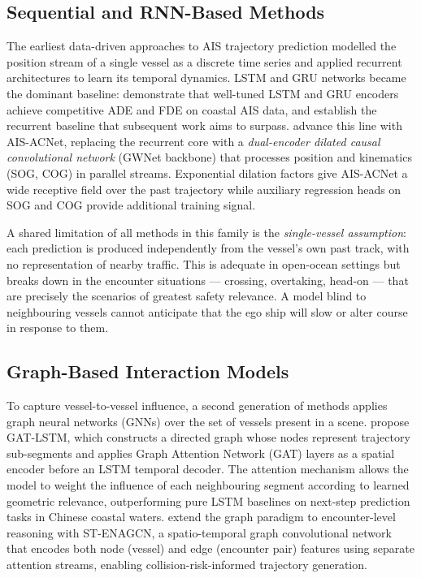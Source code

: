 \documentclass[12pt, a4paper]{article}
\begin{document}
  \subsection{Sequential and RNN-Based Methods}

  The earliest data-driven approaches to AIS trajectory prediction modelled
  the position stream of a single vessel as a discrete time series and applied
  recurrent architectures to learn its temporal dynamics.  LSTM and GRU networks
  became the dominant baseline: \citet{zhang2024lstmgru} demonstrate that
  well-tuned LSTM and GRU encoders achieve competitive ADE and FDE on coastal AIS
  data, and establish the recurrent baseline that subsequent work aims to surpass.
  \citet{shin2024aisacnet} advance this line with AIS-ACNet, replacing the recurrent
  core with a \emph{dual-encoder dilated causal convolutional network} (GWNet backbone)
  that processes position and kinematics (SOG, COG) in parallel streams.  Exponential
  dilation factors give AIS-ACNet a wide receptive field over the past trajectory
  while auxiliary regression heads on SOG and COG provide additional training signal.

  A shared limitation of all methods in this family is the \emph{single-vessel
  assumption}: each prediction is produced independently from the vessel's own
  past track, with no representation of nearby traffic.  This is adequate in
  open-ocean settings but breaks down in the encounter situations —
  crossing, overtaking, head-on — that are precisely the scenarios of greatest
  safety relevance.  A model blind to neighbouring vessels cannot anticipate that
  the ego ship will slow or alter course in response to them.

  \subsection{Graph-Based Interaction Models}

  To capture vessel-to-vessel influence, a second generation of methods applies
  graph neural networks (GNNs) over the set of vessels present in a scene.
  \citet{zhao2023gatlstm} propose GAT-LSTM, which constructs a directed graph
  whose nodes represent trajectory sub-segments and applies Graph Attention Network
  (GAT) layers as a spatial encoder before an LSTM temporal decoder.  The attention
  mechanism allows the model to weight the influence of each neighbouring segment
  according to learned geometric relevance, outperforming pure LSTM baselines on
  next-step prediction tasks in Chinese coastal waters.
  \citet{zeng2024stenagcn} extend the graph paradigm to encounter-level reasoning
  with ST-ENAGCN, a spatio-temporal graph convolutional network that encodes both
  node (vessel) and edge (encounter pair) features using separate attention streams,
  enabling collision-risk-informed trajectory generation.
\end{document}
